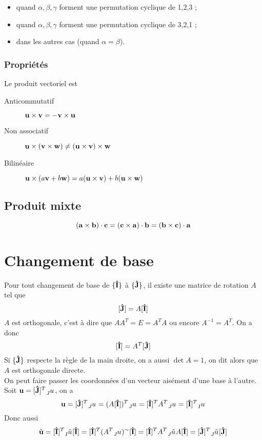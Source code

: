 \begin{itemize}
	\item {} quand $\alpha, \beta, \gamma$ forment une permutation cyclique de 1,2,3 ;
	\item {} quand $\alpha, \beta, \gamma$ forment une permutation cyclique de 3,2,1 ;
	\item {} dans les autres cas (quand $\alpha = \beta$).
\end{itemize}

\subsubsection{Propriétés}
Le produit vectoriel est
\begin{description}
  \item[Anticommutatif] ${\bf u} \times {\bf v} = - {\bf v} \times {\bf u}$
  \item[Non associatif] ${\bf u} \times ({\bf v} \times {\bf w}) \neq ({\bf u} \times {\bf v}) \times {\bf w}$
  \item[Bilinéaire] ${\bf u} \times (a{\bf v} + b{\bf w}) = a ({\bf u} \times {\bf v}) + b ({\bf u} \times {\bf w})$
\end{description}

\subsection{Produit mixte}
$$({\bf a}\times{\bf b})\cdot{\bf c} = ({\bf c}\times{\bf a})\cdot{\bf b} = ({\bf b}\times{\bf c})\cdot{\bf a}$$

\section{Changement de base}
Pour tout changement de base de $\{{\bf\hat{I}}\}$ à $\{{\bf\hat{J}}\}$, il existe une matrice de rotation $A$ tel que
\[ [{\bf\hat{J}}] = A [{\bf\hat{I}}] \]
$A$ est orthogonale, c'est à dire que $AA^T = E = A^TA$ ou encore $A^{-1} = A^T$.
On a donc
\[ [{\bf\hat{I}}] = A^T [{\bf\hat{J}}] \]
Si $\{{\bf\hat{J}}\}$ respecte la règle de la main droite, on a aussi $\det A = 1$, on dit alors que $A$ est orthogonale directe.\\
On peut faire passer les coordonnées d'un vecteur aisément d'une base à l'autre.
Soit $\fv{u} = [\uj]^T \wrt{J}{u}$, on a
\[ \fv{u} = [\uj]^T \wrt{J}{u} = (A[\ui])^T \wrt{J}{u} = [\ui]^TA^T \wrt{J}{u} = [\ui]^T \wrt{I}{u}\]
Donc aussi
\[ \tilde{\fv{u}} = [\ui]^T \wrt{I}{\tilde{u}}[\ui] = [\ui]^T (A^T \wrt{J}{u})^{\sim}[\ui] = [\ui]^T A^T \wrt{J}{\tilde{u}} A[\ui] = [\uj]^T \wrt{J}{\tilde{u}} [\uj]\]


